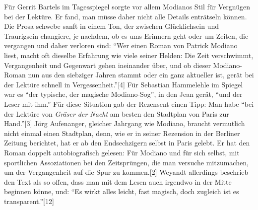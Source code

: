 \documentclass[fontsize=12pt]{scrartcl}
\begin{document}
F\"ur Gerrit Bartels im Tagesspiegel sorgte vor allem Modianos Stil f\"ur Vergn\"ugen bei der Lekt\"ure. Er fand, man m\"usse daher nicht alle Details entr\"atseln k\"onnen. Die Prosa schwebe sanft in einem Ton, der zwischen Gl\"ucklichsein und Traurigsein changiere, je nachdem, ob es ums Erinnern geht oder um Zei\-ten, die vergangen und daher verloren sind: "`Wer einen Roman von Patrick Modiano liest, macht oft dieselbe Erfah\-rung wie viele seiner Helden: Die Zeit verschwimmt, Vergangenheit und Gegenwart gehen ineinander \"uber, und ob dieser Modiano-Roman nun aus den siebziger Jahren stammt oder ein ganz aktueller ist, ger\"at bei der Lekt\"ure schnell in Vergessenheit."'[4] F\"ur Sebastian Hammelehle im Spiegel war es "`der ty\-pische, der magische Modiano-Sog"', in den Jean ger\"at, "`und der Leser mit ihm."' F\"ur diese Situation gab der Rezensent einen Tipp: Man habe "`bei der Lekt\"ure von \textit{Gr\"aser der Nacht} am besten den Stadtplan von Paris zur Hand."'[3] J\"org Aufenanger, gleicher Jahrgang wie Modiano, braucht vermutlich nicht einmal einen Stadtplan, denn, wie er in sei\-ner Rezension in der Berliner Zeitung berichtet, hat er ab den Endsechzigern \mbox{selbst} in Paris gelebt. Er hat den Roman doppelt autobiografisch gelesen: F\"ur Modiano und f\"ur sich \mbox{selbst}, mit sportlichen Assoziationen bei den Zeitspr\"ungen, die man versuche mitzumachen, um der Vergangenheit auf die Spur zu kommen.[2] Weyandt aller\-dings beschrieb den Text als so offen, dass man mit dem Lesen auch irgendwo in der Mitte beginnen k\"onne, und: "`Es wirkt alles leicht, fast magisch, doch zugleich ist es transparent."'[12]
\end{document}
